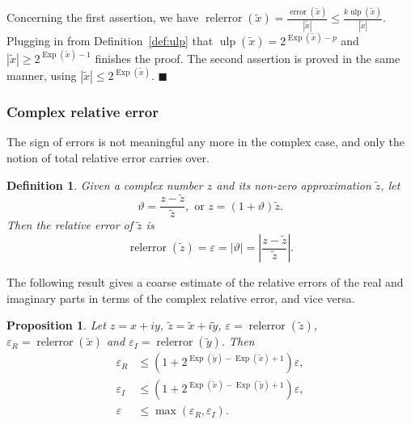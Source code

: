 \documentclass [11pt]{article}
\newcommand {\corr}[1]{{#1}}
\newcommand {\appro}[1]{\widetilde {#1}}
\newcommand {\Ulp}{{\operatorname {ulp}}}
\DeclareMathOperator{\Exp}{\operatorname {Exp}}
\newcommand{\error}{\operatorname {error}}
\newcommand{\relerror}{\operatorname {relerror}}
\renewcommand {\epsilon}{\varepsilon}
\renewcommand {\theta}{\vartheta}
\renewcommand {\leq}{\leqslant}
\renewcommand {\geq}{\geqslant}
\newtheorem{definition}[theorem]{Definition}
\newtheorem{prop}[theorem]{Proposition}
\newenvironment{proof}{\noindent{\bf Proof:}}{{\hspace* {\fill}$\blacksquare$}}
\begin{document}
\begin {proof}
Concerning the first assertion, we have
$
\relerror (\appro x) = \frac {\error (\appro x)}{|\appro x|}
\leq
\frac {k \Ulp (\appro x)}{|\appro x|}.
$
Plugging in from Definition~\ref {def:ulp} that
$\Ulp (\appro x) = 2^{\Exp (\appro x) - p}$ and
$|\appro x| \geq 2^{\Exp (\appro x) - 1}$ finishes the proof.
The second assertion is proved in the same manner, using
$|\appro x| \leq 2^{\Exp (\appro x)}$.
\end {proof}


\subsubsection {Complex relative error}
\label {sssec:comrelerror}

The sign of errors is not meaningful any more in the complex case, and
only the notion of total relative error carries over.

\begin {definition}
\label {def:comrelerror}
Given a complex number $\corr z$ and its non-zero approximation
$\appro z$, let
\[
\theta = \frac {\corr z - \appro z}{\appro z},
\text { or }
\corr z = (1 + \theta) \appro z.
\]
Then the {\em relative error} of $\appro z$ is
\[
\relerror (\appro z) = \epsilon = | \theta |
= \left| \frac {\corr z - \appro z}{\appro z} \right|.
\]
\end {definition}

The following result gives a coarse
estimate of the relative errors of the real and imaginary parts in terms of
the complex relative error, and vice versa.

\begin {prop}
\label {prop:comrelerror}
Let $\corr z = \corr x + i \corr y$, $\appro z = \appro x + i \appro y$,
$\epsilon = \relerror (\appro z)$,
$\epsilon_R = \relerror (\appro x)$ and
$\epsilon_I = \relerror (\appro y)$. Then
\begin {align*}
\epsilon_R
&\leq \left( 1 + 2^{\Exp (\appro y) - \Exp (\appro x) + 1} \right) \epsilon, \\
\epsilon_I
&\leq \left( 1 + 2^{\Exp (\appro x) - \Exp (\appro y) + 1} \right) \epsilon, \\
\epsilon
&\leq \max \left( \epsilon_R, \epsilon_I \right).
\end {align*}
\end {prop}
\end{document}
